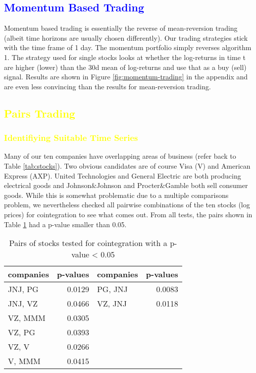 \subsection{\textcolor{blue}{Momentum Based Trading}}
Momentum based trading is essentially the reverse of mean-reversion trading (albeit time horizons are usually chosen differently). Our trading strategies stick with the time frame of 1 day. The momentum portfolio simply reverses algorithm 1. The strategy used for single stocks looks at whether the log-returns in time t are higher (lower) than the 30d mean of log-returns and use that as a buy (sell) signal. Results are shown in Figure \ref{fig:momentum-trading} in the appendix and are even less convincing than the results for mean-reversion trading. 

\subsection{\textcolor{yellow}{Pairs Trading}}
\subsubsection{\textcolor{yellow}{Identifiying Suitable Time Series}}
Many of our ten companies have overlapping areas of business (refer back to Table \ref{tab:stocks}). Two obvious candidates are of course Visa (V) and American Express (AXP). United Technologies and General Electric are both producing electrical goods and Johnson\&Johnson and Procter\&Gamble both sell consumer goods. While this is somewhat problematic due to a multiple comparisons problem, we nevertheless checked all pairwise combinations of the ten stocks (log prices) for cointegration to see what comes out. From all tests, the pairs shown in Table \ref{tab:coint} had a p-value smaller than 0.05.

\begin{table}[h!]
    \centering
\small
\begin{tabular}{lrlr}
\toprule
companies &   p-values & companies & p-values \\
\midrule
JNJ, PG & 0.0129 & PG, JNJ & 0.0083  \\
\vspace{1ex}
JNJ, VZ & 0.0466 & VZ, JNJ & 0.0118 \\
\vspace{0.2ex}
VZ, MMM & 0.0305 & & \\
\vspace{0.2ex}
VZ, PG & 0.0393 & & \\
\vspace{0.2ex}
VZ, V & 0.0266  & & \\
\vspace{0.2ex}
V, MMM & 0.0415 & & \\
\bottomrule
\end{tabular}
    \caption{Pairs of stocks tested for cointegration with a p-value < 0.05}
    \label{tab:coint}
\end{table}

